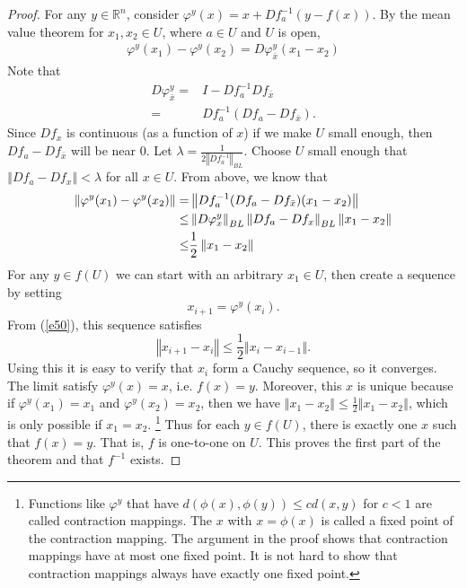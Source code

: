 \documentclass[12pt,reqno]{amsart}
\theoremstyle{definition}
\def\R{\mathbb{R}}
\newcommand{\norm}[1]{\left\Vert {#1} \right\Vert}
\begin{document}
\begin{proof} 
  For any $y
  \in \R^n$, consider $\varphi^y(x) = x + Df_a^{-1} \left(y - f(x)
  \right)$. 
  By the mean value theorem for $x_1, x_2 \in U$, where $a \in
  U$ and $U$ is open, 
  \begin{align*}
    \varphi^y(x_1) - \varphi^y(x_2) = D\varphi^y_{\bar{x}}  (x_1 -
    x_2)  
  \end{align*}
  Note that 
  \begin{align*}
    D \varphi^y_{\bar{x}} = & I - Df_a^{-1} Df_{\bar{x}} \\ 
    = & Df_a^{-1} (Df_a - Df_{\bar{x}}).
  \end{align*}
  Since $Df_x$ is continuous (as a function of $x$) if we make $U$
  small enough, then $Df_a - Df_{\bar{x}}$ will be near $0$. Let
  $\lambda = \frac{1}{2 \norm{Df_a^{-1}}_{BL}}$. Choose $U$ small
  enough that $\norm{Df_a - Df_{x}} < \lambda$ for all $x \in U$. From
  above, we know that
  \begin{align}
    \norm{\varphi^y(x_1) - \varphi^y(x_2)} = & \norm{Df_a^{-1} (Df_a -
      Df_{\bar{x}})(x_1-x_2) } \notag \\
    \leq & \norm{D \varphi^y_x}_{BL} \norm{Df_a -
      Df_x}_{BL} \norm{x_1 - x_2} \notag \\
    \leq & \frac{1}{2}\norm{x_1 - x_2} \label{e50}
  \end{align}
  For any $y \in f(U)$ we can start with an arbitrary $x_1 \in U$,
  then create a sequence by setting 
  \[ x_{i+1} = \varphi^y(x_i). \]
  From (\ref{e50}), this sequence satisfies 
  \[ \norm{x_{i+1} - x_i} \leq \frac{1}{2} \norm{x_i - x_{i-1} }. \]
  Using this it is easy to verify that $x_i$ form a Cauchy sequence,
  so it converges. The limit satisfy $\varphi^y(x) = x$, i.e. $f(x) =
  y$. Moreover, this $x$ is unique because if $\varphi^y(x_1) = x_1$
  and $\varphi^y(x_2) = x_2$, then we have $\norm{x_1 - x_2} \leq
  \frac{1}{2}\norm{x_1-x_2}$, which is only possible if $x_1 = x_2$.
  \footnote{Functions like $\varphi^y$ that have $d(\phi(x),\phi(y))
    \leq c d(x,y)$ for $c<1$ are called contraction mappings. The $x$
    with $x=\phi(x)$ is called a fixed point of the contraction
    mapping. The argument in the proof shows that contraction mappings
    have at most one fixed point. It is not hard to show that
    contraction mappings always have exactly one fixed point.}  Thus
  for each $y \in f(U)$, there is exactly one $x$ such that $f(x) =
  y$. That is, $f$ is one-to-one on $U$. This proves the first part of
  the theorem and that $f^{-1}$ exists.


\end{proof}
\end{document}
